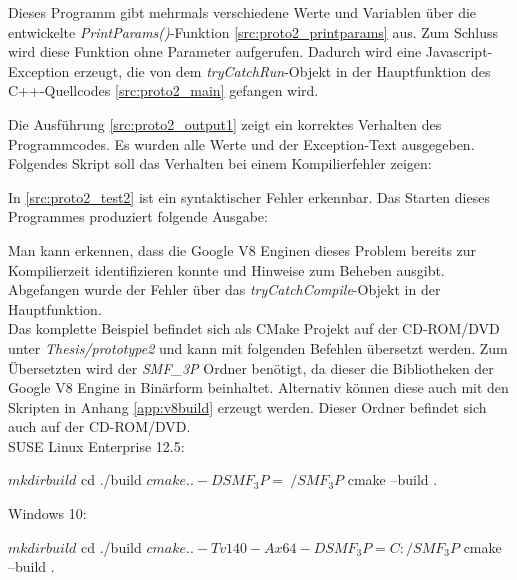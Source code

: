 Dieses Programm gibt mehrmals verschiedene Werte und Variablen über die entwickelte \textit{PrintParams()}-Funktion \ref{src:proto2_printparams} aus.
Zum Schluss wird diese Funktion ohne Parameter aufgerufen. Dadurch wird eine Javascript-Exception erzeugt, die von dem \textit{tryCatchRun}-Objekt in der Hauptfunktion
des C++-Quellcodes \ref{src:proto2_main} gefangen wird.



Die Ausführung \ref{src:proto2_output1} zeigt ein korrektes Verhalten des Programmcodes. Es wurden alle Werte und der Exception-Text ausgegeben. 
Folgendes Skript soll das Verhalten bei einem Kompilierfehler zeigen:



In \ref{src:proto2_test2} ist ein syntaktischer Fehler erkennbar. Das Starten dieses Programmes produziert folgende Ausgabe:



Man kann erkennen, dass die Google V8 Enginen dieses Problem bereits zur Kompilierzeit identifizieren konnte und Hinweise zum Beheben ausgibt.
Abgefangen wurde der Fehler über das \textit{tryCatchCompile}-Objekt in der Hauptfunktion. \\

Das komplette Beispiel befindet sich als CMake \cite{cmake} Projekt auf der CD-ROM/DVD unter \textit{Thesis/prototype2} und kann mit folgenden Befehlen 
übersetzt werden. Zum Übersetzten wird der \textit{SMF\_3P} Ordner benötigt, da dieser die Bibliotheken der Google V8 Engine in Binärform beinhaltet. Alternativ können
diese auch mit den Skripten in Anhang \ref{app:v8build} erzeugt werden. Dieser Ordner befindet sich auch auf der CD-ROM/DVD. \\

SUSE Linux Enterprise 12.5:

\begin{GenericCode}
$ mkdir build
$ cd ./build
$ cmake .. -DSMF_3P=~/SMF_3P
$ cmake --build .
\end{GenericCode}

Windows 10:

\begin{GenericCode}
$ mkdir build
$ cd ./build
$ cmake .. -T v140 -A x64 -DSMF_3P=C:/SMF_3P
$ cmake --build .
\end{GenericCode}
